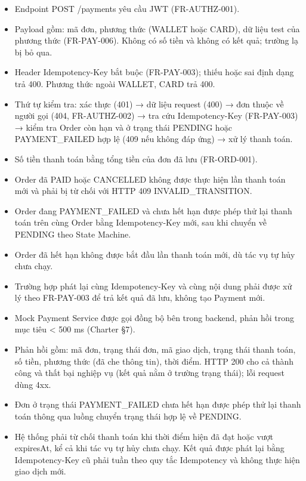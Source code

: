 \documentclass[11pt,a4paper,oneside]{report}
\begin{document}
\begin{itemize}
\item
  Endpoint POST /payments yêu cầu JWT (FR-AUTHZ-001).
\item
  Payload gồm: mã đơn, phương thức (WALLET hoặc CARD), dữ liệu test của phương thức (FR-PAY-006). Không có số tiền và không có kết quả; trường lạ bị bỏ qua.
\item
  Header Idempotency-Key bắt buộc (FR-PAY-003); thiếu hoặc sai định dạng trả 400. Phương thức ngoài WALLET, CARD trả 400.
\item
  Thứ tự kiểm tra: xác thực (401) → dữ liệu request (400) → đơn thuộc về người gọi (404, FR-AUTHZ-002) → tra cứu Idempotency-Key (FR-PAY-003) → kiểm tra Order còn hạn và ở trạng thái PENDING hoặc PAYMENT\_FAILED hợp lệ (409 nếu không đáp ứng) → xử lý thanh toán.
\item
  Số tiền thanh toán bằng tổng tiền của đơn đã lưu (FR-ORD-001).
\item
  Order đã PAID hoặc CANCELLED không được thực hiện lần thanh toán mới và phải bị từ chối với HTTP 409 INVALID\_TRANSITION.
\item
  Order đang PAYMENT\_FAILED và chưa hết hạn được phép thử lại thanh toán trên cùng Order bằng Idempotency-Key mới, sau khi chuyển về PENDING theo State Machine.
\item
  Order đã hết hạn không được bắt đầu lần thanh toán mới, dù tác vụ tự hủy chưa chạy.
\item
  Trường hợp phát lại cùng Idempotency-Key và cùng nội dung phải được xử lý theo FR-PAY-003 để trả kết quả đã lưu, không tạo Payment mới.
\item
  Mock Payment Service được gọi đồng bộ bên trong backend, phản hồi trong mục tiêu \textless{} 500 ms (Charter §7).
\item
  Phản hồi gồm: mã đơn, trạng thái đơn, mã giao dịch, trạng thái thanh toán, số tiền, phương thức (đã che thông tin), thời điểm. HTTP 200 cho cả thành công và thất bại nghiệp vụ (kết quả nằm ở trường trạng thái); lỗi request dùng 4xx.
\item
  Đơn ở trạng thái PAYMENT\_FAILED chưa hết hạn được phép thử lại thanh toán thông qua luồng chuyển trạng thái hợp lệ về PENDING.
\item
  Hệ thống phải từ chối thanh toán khi thời điểm hiện đã đạt hoặc vượt expiresAt, kể cả khi tác vụ tự hủy chưa chạy. Kết quả được phát lại bằng Idempotency-Key cũ phải tuần theo quy tắc Idempotency và không thực hiện giao dịch mới.
\end{itemize}
\end{document}
